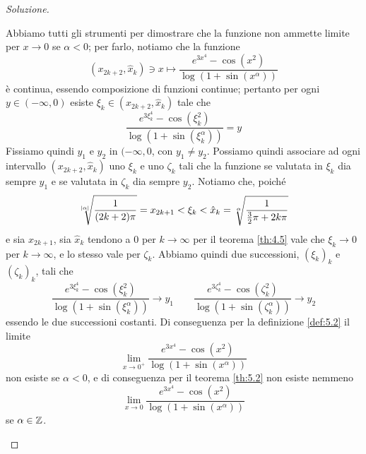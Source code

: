 \begin{proof}[Soluzione]
\begin{enumerate}[(i)]
\begin{center}
    \end{center}
        Abbiamo tutti gli strumenti per dimostrare che la funzione non ammette limite per $x\to 0$ se $\alpha<0$; per farlo, notiamo che la funzione
        \[
        (x_{2k+2}, \hat{x}_k) \ni x\mapsto \frac{e^{3x^4}-\cos(x^2)}{\log(1+\sin(x^\alpha))}
        \]
        è continua, essendo composizione di funzioni continue; pertanto per ogni $y\in(-\infty, 0)$ esiste $\xi_k\in(x_{2k+2}, \hat{x}_k)$ tale che
        \[
        \frac{e^{3\xi_k^4}-\cos(\xi_k^2)}{\log(1+\sin(\xi_k^\alpha))} = y
        \]
        Fissiamo quindi $y_1$ e $y_2$ in $(-\infty, 0$, con $y_1 \ne y_2$. Possiamo quindi associare ad ogni intervallo $(x_{2k+2}, \hat{x}_k)$ uno $\xi_k$ e uno $\zeta_k$ tali che la funzione se valutata in $\xi_k$ dia sempre $y_1$ e se valutata in $\zeta_k$ dia sempre $y_2$. Notiamo che, poiché
        \[
        \sqrt[\abs{\alpha}]{\frac{1}{(2k+2)\pi}} = x_{2k+1}<\xi_k<\hat{x}_k =\sqrt[\alpha]{\frac{1}{\frac{3}{2}\pi + 2k\pi}}
        \]
        e sia $x_{2k+1}$, sia $\hat{x}_k$ tendono a 0 per $k\to \infty$ per il teorema \ref{th:4.5} vale che $\xi_k \to 0$ per $k\to\infty$, e lo stesso vale per $\zeta_k$. Abbiamo quindi due successioni, $(\xi_k)_k$ e $(\zeta_k)_k$, tali che
        \[
        \frac{e^{3\xi_k^4}-\cos(\xi_k^2)}{\log(1+\sin(\xi_k^\alpha))} \to y_1 \qquad \frac{e^{3\zeta_k^4}-\cos(\zeta_k^2)}{\log(1+\sin(\zeta_k^\alpha))} \to y_2
        \]
        essendo le due successioni costanti. Di conseguenza per la definizione \ref{def:5.2} il limite 
        \[
        \lim_{x\to 0^+} \frac{e^{3x^4}-\cos(x^2)}{\log(1+\sin(x^\alpha))}
        \]
        non esiste se $\alpha<0$, e di conseguenza per il teorema \ref{th:5.2} non esiste nemmeno
        \[
        \lim_{x\to 0} \frac{e^{3x^4}-\cos(x^2)}{\log(1+\sin(x^\alpha))}
        \]
        se $\alpha\in\amsbb{Z}$.
    \end{enumerate}
\end{proof}
